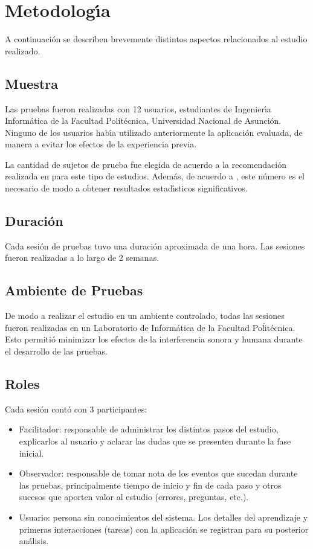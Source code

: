 \section{Metodolog{\'\i}a}
\label{sec:metodolog{\'\i}a}
A continuaci\'on se describen brevemente distintos aspectos relacionados al
estudio realizado.

\subsection{Muestra}
Las pruebas fueron realizadas con 12 usuarios, estudiantes de Ingenier{\'\i}a Inform\'atica
de la Facultad Polit\'ecnica, Universidad Nacional de Asunci\'on. Ninguno de los usuarios 
hab{\'\i}a utilizado anteriormente la aplicaci\'on evaluada, de manera a evitar los efectos
de la experiencia previa.

La cantidad de sujetos de prueba fue elegida de acuerdo a la recomendaci\'on realizada
en \cite{Hwang:2010} para este tipo de estudios. Adem\'as, de acuerdo a \cite[p.~267]{Rubin2008}, 
este n\'umero es el necesario de modo a obtener resultados estad{\'\i}sticos significativos.

\subsection{Duraci\'on}
Cada sesi\'on de pruebas tuvo una duraci\'on aproximada de una hora.
Las sesiones fueron realizadas a lo largo de 2 semanas.

\subsection{Ambiente de Pruebas}
De modo a realizar el estudio en un ambiente controlado, todas las sesiones fueron
realizadas en un Laboratorio de Inform\'atica de la Facultad Poĺit\'ecnica. Esto
permiti\'o minimizar los efectos de la interferencia sonora y humana durante el
desarrollo de las pruebas.

\subsection{Roles}
Cada sesi\'on cont\'o con 3 participantes:
	\begin{itemize}
		\item Facilitador: responsable de administrar los distintos pasos del estudio, explicarlos al usuario 
		y aclarar las dudas que se presenten durante la fase inicial. 
		\item Observador: responsable de tomar nota de los eventos que sucedan durante las pruebas, principalmente
		tiempo de inicio y fin de cada paso y otros sucesos que aporten valor al estudio (errores, preguntas, etc.).
		\item Usuario: persona sin conocimientos del sistema. Los detalles del aprendizaje y primeras interacciones
		(tareas) con la aplicaci\'on se registran para su posterior an\'alisis.	
	\end{itemize}

